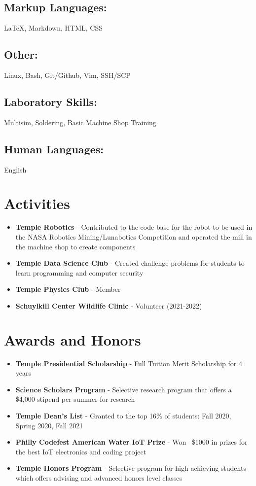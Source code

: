 \documentclass[letterpaper,11pt]{article}
\begin{document}
\subsection{Markup Languages:}
{\LaTeX}, Markdown, HTML, CSS
\subsection{Other:}
Linux, Bash, Git/Github, Vim, SSH/SCP
\subsection{Laboratory Skills:} Multisim, Soldering, Basic Machine Shop Training
\subsection{Human Languages:}
English

\section{Activities}
\begin{itemize}
    \item \textbf{Temple Robotics} - Contributed to the code base for the robot to be used in the NASA Robotics Mining/Lunabotics Competition and operated the mill in the machine shop to create components
    \item \textbf{Temple Data Science Club} - Created challenge problems for students to learn programming and computer security
    \item \textbf{Temple Physics Club} - Member
    \item \textbf{Schuylkill Center Wildlife Clinic} - Volunteer (2021-2022)
\end{itemize}


\section{Awards and Honors}
\begin{itemize}
    \item \textbf{Temple Presidential Scholarship} - Full Tuition Merit Scholarship for 4 years
    \item \textbf{Science Scholars Program} - Selective research program that offers a \$4,000 stipend per summer for research
    \item \textbf{Temple Dean's List} - Granted to the top 16\% of students: Fall 2020, Spring 2020, Fall 2021
    \item \textbf{Philly Codefest American Water IoT Prize} - Won ~\$1000 in prizes for the best IoT electronics and coding project
    \item \textbf{Temple Honors Program} - Selective program for high-achieving students which offers advising and advanced honors level classes
\end{itemize}
\end{document}
